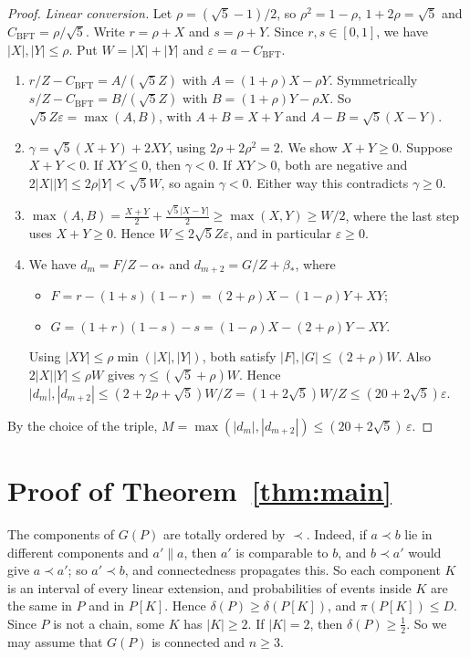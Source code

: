 \documentclass[10pt]{amsart}
\theoremstyle{definition}
\theoremstyle{remark}
\newcommand{\inc}{\parallel}
\newcommand{\CB}{C_{\mathrm{BFT}}}
\begin{document}
\begin{proof}
\emph{Linear conversion.} Let $\rho=(\sqrt5-1)/2$, so $\rho^2=1-\rho$, $1+2\rho=\sqrt5$ and $\CB=\rho/\sqrt5$.
Write $r=\rho+X$ and $s=\rho+Y$. Since $r,s\in[0,1]$, we have $|X|,|Y|\le\rho$. Put $W=|X|+|Y|$ and $\varepsilon=a-\CB$.
\begin{enumerate}[label=(\arabic*)]
\item $r/Z-\CB=A/(\sqrt5 Z)$ with $A=(1+\rho)X-\rho Y$. Symmetrically $s/Z-\CB=B/(\sqrt5Z)$ with $B=(1+\rho)Y-\rho X$. So $\sqrt5Z\varepsilon=\max(A,B)$, with $A+B=X+Y$ and $A-B=\sqrt5(X-Y)$.
\item $\gamma=\sqrt5(X+Y)+2XY$, using $2\rho+2\rho^2=2$. We show $X+Y\ge0$. Suppose $X+Y<0$. If $XY\le0$, then $\gamma<0$. If $XY>0$, both are negative and $2|X||Y|\le2\rho|Y|<\sqrt5 W$, so again $\gamma<0$. Either way this contradicts $\gamma\ge0$.
\item $\max(A,B)=\frac{X+Y}2+\frac{\sqrt5|X-Y|}2\ge\max(X,Y)\ge W/2$, where the last step uses $X+Y\ge0$. Hence $W\le 2\sqrt5 Z\varepsilon$, and in particular $\varepsilon\ge0$.
\item We have $d_m=F/Z-\alpha_*$ and $d_{m+2}=G/Z+\beta_*$, where
\begin{itemize}
\item $F=r-(1+s)(1-r)=(2+\rho)X-(1-\rho)Y+XY$;
\item $G=(1+r)(1-s)-s=(1-\rho)X-(2+\rho)Y-XY$.
\end{itemize}
Using $|XY|\le\rho\min(|X|,|Y|)$, both satisfy $|F|,|G|\le(2+\rho)W$. Also $2|X||Y|\le\rho W$ gives $\gamma\le(\sqrt5+\rho)W$.
Hence $|d_m|,|d_{m+2}|\le(2+2\rho+\sqrt5)W/Z=(1+2\sqrt5)W/Z\le(20+2\sqrt5)\varepsilon$.
\end{enumerate}
By the choice of the triple, $M=\max(|d_m|,|d_{m+2}|)\le(20+2\sqrt5)\,\varepsilon$.
\end{proof}

\section{\texorpdfstring{Proof of Theorem~\ref{thm:main}}{Proof of Theorem 1.2}}

The components of $G(P)$ are totally ordered by $\prec$. Indeed, if $a\prec b$ lie in different components and $a'\inc a$, then $a'$ is comparable to $b$, and $b\prec a'$ would give $a\prec a'$; so $a'\prec b$, and connectedness propagates this.
So each component $K$ is an interval of every linear extension, and probabilities of events inside $K$ are the same in $P$ and in $P[K]$.
Hence $\delta(P)\ge\delta(P[K])$, and $\pi(P[K])\le D$.
Since $P$ is not a chain, some $K$ has $|K|\ge2$. If $|K|=2$, then $\delta(P)\ge\frac12$.
So we may assume that $G(P)$ is connected and $n\ge3$.
\end{document}
